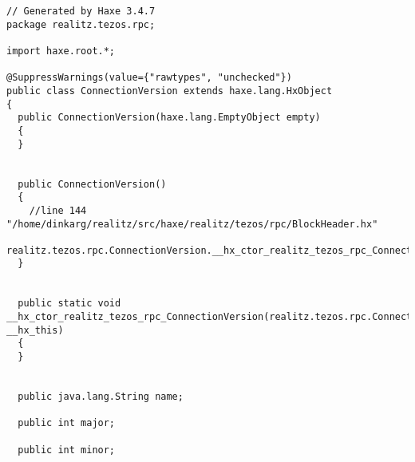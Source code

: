 \documentclass{article}
\begin{document}
\begin{lstlisting}
// Generated by Haxe 3.4.7
package realitz.tezos.rpc;

import haxe.root.*;

@SuppressWarnings(value={"rawtypes", "unchecked"})
public class ConnectionVersion extends haxe.lang.HxObject
{
  public ConnectionVersion(haxe.lang.EmptyObject empty)
  {
  }
  
  
  public ConnectionVersion()
  {
    //line 144 "/home/dinkarg/realitz/src/haxe/realitz/tezos/rpc/BlockHeader.hx"
    realitz.tezos.rpc.ConnectionVersion.__hx_ctor_realitz_tezos_rpc_ConnectionVersion(this);
  }
  
  
  public static void __hx_ctor_realitz_tezos_rpc_ConnectionVersion(realitz.tezos.rpc.ConnectionVersion __hx_this)
  {
  }
  
  
  public java.lang.String name;
  
  public int major;
  
  public int minor;
  
\end{lstlisting}
\end{document}
